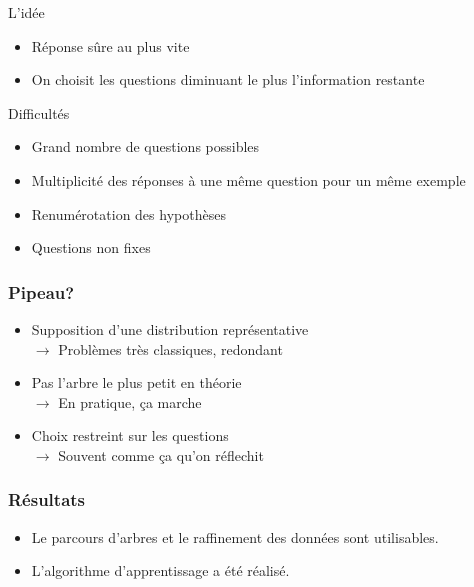 \begin{frame}

  L'idée
  \begin{itemize}
  \item Réponse sûre au plus vite
  \item On choisit les questions diminuant le plus l'information restante
  \end{itemize}

  Difficultés
  \begin{itemize}
    \item Grand nombre de questions possibles
    \item Multiplicité des réponses à une même question pour un même exemple
    \item Renumérotation des hypothèses
    \item Questions non fixes
  \end{itemize}


\end{frame}


\begin{frame}
\frametitle{Pipeau?}
\begin{itemize}
\item Supposition d'une distribution représentative \\
  $\rightarrow$ Problèmes très classiques, redondant
\item Pas l'arbre le plus petit en théorie \\
  $\rightarrow$ En pratique, ça marche
\item Choix restreint sur les questions\\
  $\rightarrow$ Souvent comme ça qu'on réflechit
\end{itemize}
\end{frame}


\begin{frame}
\frametitle{Résultats}

\begin{itemize}
    \item Le parcours d'arbres et le raffinement des données sont utilisables.
    \item L'algorithme d'apprentissage a été réalisé.
\end{itemize}

\end{frame}
